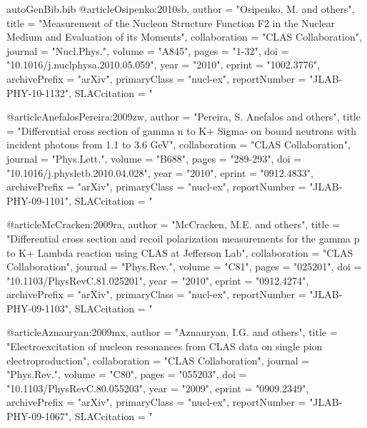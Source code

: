 \begin{filecontents*}{autoGenBib.bib}
@article{Osipenko:2010sb,
      author         = "Osipenko, M. and others",
      title          = "{Measurement of the Nucleon Structure Function F2 in the
                        Nuclear Medium and Evaluation of its Moments}",
      collaboration  = "CLAS Collaboration",
      journal        = "Nucl.Phys.",
      volume         = "A845",
      pages          = "1-32",
      doi            = "10.1016/j.nuclphysa.2010.05.059",
      year           = "2010",
      eprint         = "1002.3776",
      archivePrefix  = "arXiv",
      primaryClass   = "nucl-ex",
      reportNumber   = "JLAB-PHY-10-1132",
      SLACcitation   = "%
}

@article{AnefalosPereira:2009zw,
      author         = "Pereira, S. Anefalos and others",
      title          = "{Differential cross section of gamma n to K+ Sigma- on
                        bound neutrons with incident photons from 1.1 to 3.6 GeV}",
      collaboration  = "CLAS Collaboration",
      journal        = "Phys.Lett.",
      volume         = "B688",
      pages          = "289-293",
      doi            = "10.1016/j.physletb.2010.04.028",
      year           = "2010",
      eprint         = "0912.4833",
      archivePrefix  = "arXiv",
      primaryClass   = "nucl-ex",
      reportNumber   = "JLAB-PHY-09-1101",
      SLACcitation   = "%
}

@article{McCracken:2009ra,
      author         = "McCracken, M.E. and others",
      title          = "{Differential cross section and recoil polarization
                        measurements for the gamma p to K+ Lambda reaction using
                        CLAS at Jefferson Lab}",
      collaboration  = "CLAS Collaboration",
      journal        = "Phys.Rev.",
      volume         = "C81",
      pages          = "025201",
      doi            = "10.1103/PhysRevC.81.025201",
      year           = "2010",
      eprint         = "0912.4274",
      archivePrefix  = "arXiv",
      primaryClass   = "nucl-ex",
      reportNumber   = "JLAB-PHY-09-1103",
      SLACcitation   = "%
}

@article{Aznauryan:2009mx,
      author         = "Aznauryan, I.G. and others",
      title          = "{Electroexcitation of nucleon resonances from CLAS data
                        on single pion electroproduction}",
      collaboration  = "CLAS Collaboration",
      journal        = "Phys.Rev.",
      volume         = "C80",
      pages          = "055203",
      doi            = "10.1103/PhysRevC.80.055203",
      year           = "2009",
      eprint         = "0909.2349",
      archivePrefix  = "arXiv",
      primaryClass   = "nucl-ex",
      reportNumber   = "JLAB-PHY-09-1067",
      SLACcitation   = "%
}


\end{filecontents*}
